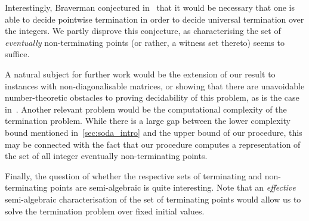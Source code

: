 Interestingly, Braverman conjectured in~\cite{Bra06} that it would be necessary that one is able to decide pointwise termination in order to decide universal termination over the integers. We partly disprove this conjecture, as characterising the set of \emph{eventually} non-terminating points (or rather, a witness set thereto) seems to suffice.

A natural subject for further work would be the extension of our result to instances with non-diagonalisable matrices, or showing that there are unavoidable number-theoretic obstacles to proving decidability of this problem, as is the case in~\cite{OW14:SODA}.
Another relevant problem would be the computational complexity of the termination problem.  While there is a large gap between the \coNP{} lower complexity bound mentioned in~\cref{sec:soda_intro} and the \EXPSPACE{} upper bound of our procedure, this may be connected with the fact that our procedure computes a representation of the set of all integer eventually non-terminating points.

Finally, the question of whether the respective sets of terminating and non-terminating points are semi-algebraic is quite interesting.  Note that an \emph{effective} semi-algebraic characterisation of the set of terminating points would allow us to solve the termination problem over fixed initial values.


